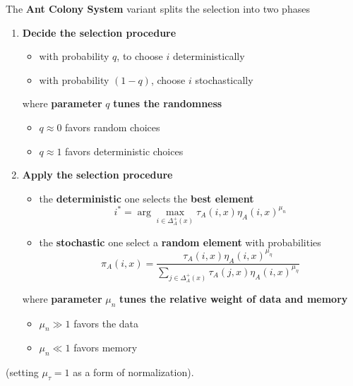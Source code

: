 The \textbf{Ant Colony System} variant splits the selection into two phases
\begin{enumerate}
	\item \textbf{Decide the selection procedure}
	\begin{itemize}
		\item with probability $q$, to choose $i$ deterministically
		
		\item with probability $(1 − q)$, choose $i$ stochastically
	\end{itemize}
	
	where \textbf{parameter} $q$ \textbf{tunes the randomness}
	\begin{itemize}
		\item $q \approx 0$ favors random choices
		
		\item $q \approx 1$ favors deterministic choices
	\end{itemize}
	\nn
	
	\item \textbf{Apply the selection procedure}
	\begin{itemize}
		\item the \textbf{deterministic} one selects the \textbf{best element}
		$$ i^\ast = \arg \max_{i \in \Delta_A^+ (x)} \tau_A (i, x) \eta_A (i, x)^{\mu_n } $$
		
		\item the \textbf{stochastic} one select a \textbf{random element} with probabilities
		$$ \pi_A (i,x) = \frac{ \tau_A (i, x) \eta_A (i, x)^{\mu_{\eta} } }{ \sum_{j \in \Delta_A^+ (x)} \tau_A (j, x) \eta_A (i,x)^{\mu_{\eta} } } $$
	\end{itemize}
	
	where \textbf{parameter} $\mu_n$ \textbf{tunes the relative weight of data and memory}
	\begin{itemize}
		\item $\mu_n \gg 1$ favors the data
		
		\item $\mu_n \ll 1$ favors memory
	\end{itemize}
\end{enumerate}
(setting $\mu_{\tau} = 1$ as a form of normalization).\\

\newpage

